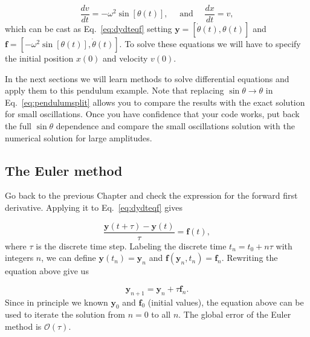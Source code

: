 \begin{equation}
 \dfrac{dv}{dt} = -\omega^2\sin[\theta(t)],  \quad \text{ and } \quad \dfrac{dx}{dt} = v,
 \label{eq:pendulumsplit}
\end{equation}
which can be cast as Eq.~\eqref{eq:dydteqf} setting $\bm{y} = [\dot{\theta}(t), \theta(t)]$ and $\bm{f} = [-\omega^2\sin[\theta(t)], \dot{\theta}(t)]$. To solve these equations we will have to specify the initial position $x(0)$ and velocity $v(0)$.

In the next sections we will learn methods to solve differential equations and apply them to this pendulum example. Note that replacing $\sin\theta \rightarrow \theta$ in Eq.~\eqref{eq:pendulumsplit} allows you to compare the results with the exact solution for small oscillations. Once you have confidence that your code works, put back the full $\sin\theta$ dependence and compare the small oscillations solution with the numerical solution for large amplitudes.

\subsection{The Euler method}

Go back to the previous Chapter and check the expression for the forward first derivative. Applying it to Eq.~\eqref{eq:dydteqf} gives

\begin{equation}
 \dfrac{\bm{y}(t+\tau) - \bm{y}(t)}{\tau} = \bm{f}(t),
\end{equation}
where $\tau$ is the discrete time step. Labeling the discrete time $t_n = t_0 + n\tau$ with integers $n$, we can define $\bm{y}(t_n) = \bm{y}_n$ and $\bm{f}(\bm{y}_n, t_n) = \bm{f}_n$. Rewriting the equation above give us

\begin{equation}
 \bm{y}_{n+1} = \bm{y}_n + \tau \bm{f}_n.
 \label{eq:euler}
\end{equation}
Since in principle we known $\bm{y}_0$ and $\bm{f}_0$ (initial values), the equation above can be used to iterate the solution from $n=0$ to all $n$. The global error of the Euler method is $\mathcal{O}(\tau)$.

